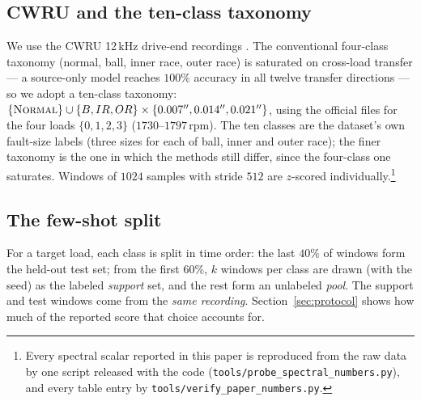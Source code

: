 \documentclass[journal]{IEEEtran}
\begin{document}
\subsection{CWRU and the ten-class taxonomy}
We use the CWRU 12\,kHz drive-end recordings \cite{smith2015cwru}. The
conventional four-class
taxonomy (normal, ball, inner race, outer race) is saturated on cross-load
transfer --- a source-only model reaches $100\%$ accuracy in all twelve
transfer directions --- so we adopt a ten-class taxonomy:
$\{\textsc{Normal}\} \cup \{B,IR,OR\} \times \{0.007'', 0.014'', 0.021''\}$,
using the official files for the four loads $\{0,1,2,3\}$
($1730$--$1797$\,rpm). The ten classes are the dataset's own fault-size labels
(three sizes for each of ball, inner and outer race); the finer taxonomy is the
one in which the methods still differ, since the four-class one saturates.
Windows of $1024$ samples with stride $512$ are $z$-scored individually.\footnote{Every spectral scalar reported in this paper
is reproduced from the raw data by one script released with the code
(\texttt{tools/probe\_spectral\_numbers.py}), and every table entry by
\texttt{tools/verify\_paper\_numbers.py}.}

\subsection{The few-shot split}
For a target load, each class is split in time order: the last $40\%$ of
windows form the held-out test set; from the first $60\%$, $k$ windows per
class are drawn (with the seed) as the labeled \emph{support} set, and the rest
form an unlabeled \emph{pool}. The support and test windows come
from the \emph{same recording}. Section~\ref{sec:protocol} shows how much of
the reported score that choice accounts for.
\end{document}
